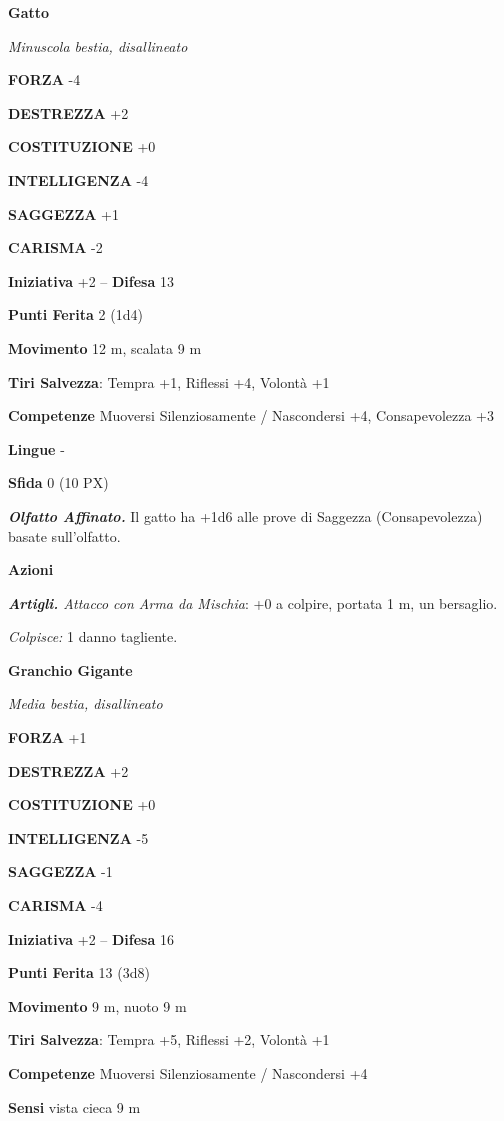 \begin{multicols}{2}
\medskip\textbf{Gatto}

\textit{Minuscola bestia, disallineato}

\textbf{FORZA} -4

\textbf{DESTREZZA} +2

\textbf{COSTITUZIONE} +0

\textbf{INTELLIGENZA} -4

\textbf{SAGGEZZA} +1

\textbf{CARISMA} -2

\textbf{Iniziativa} +2 -- \textbf{Difesa} 13

\textbf{Punti Ferita} 2 (1d4)

\textbf{Movimento} 12 m, scalata 9 m

\textbf{Tiri Salvezza}: Tempra +1, Riflessi +4, Volontà +1

\textbf{Competenze} Muoversi Silenziosamente / Nascondersi +4, Consapevolezza +3

\textbf{Lingue} -

\textbf{Sfida} 0 (10 PX)

\textit{\textbf{Olfatto Affinato.}} Il gatto ha +1d6 alle prove di Saggezza (Consapevolezza) basate sull'olfatto.

\textbf{Azioni}

\textit{\textbf{Artigli.} Attacco con Arma da Mischia}: +0 a colpire, portata 1 m, un bersaglio.

\textit{Colpisce:} 1 danno tagliente.

\medskip\textbf{Granchio Gigante}

\textit{Media bestia, disallineato}

\textbf{FORZA} +1

\textbf{DESTREZZA} +2

\textbf{COSTITUZIONE} +0

\textbf{INTELLIGENZA} -5

\textbf{SAGGEZZA} -1

\textbf{CARISMA} -4

\textbf{Iniziativa} +2 -- \textbf{Difesa} 16

\textbf{Punti Ferita} 13 (3d8)

\textbf{Movimento} 9 m, nuoto 9 m

\textbf{Tiri Salvezza}: Tempra +5, Riflessi +2, Volontà +1

\textbf{Competenze} Muoversi Silenziosamente / Nascondersi +4

\textbf{Sensi} vista cieca 9 m


\end{multicols}
